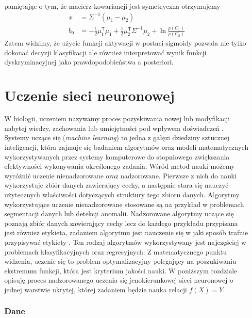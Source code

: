 \documentclass[11pt]{book}
\theoremstyle{definition}
\begin{document}
%
pamiętając o tym, że macierz kowariancji jest symetryczna otrzymujemy
%
\begin{subequations}
	\begin{align}
	x &= \Sigma^{-1} \left(\mu_1 - \mu_2\right)\\
	b_0 &= - \frac{1}{2} \mu_1^\mathsf{T}\mu_1 + \frac{1}{2} \mu_2^\mathsf{T} \Sigma^{-1} \mu_2 + \ln \frac{p(C_1)}{p(C_2)}
	\end{align}
\end{subequations}
%
Zatem widzimy, że użycie funkcji aktywacji w postaci sigmoidy pozwala nie tylko dokonać decyzji klasyfikacji ale również interpretować wynik funkcji dyskryminacyjnej jako prawdopodobieństwa a posteriori.
%
\fi


\section{Uczenie sieci neuronowej}
\label{backprop}

W biologii, uczeniem nazywamy proces pozyskiwania nowej lub modyfikacji nabytej wiedzy, zachowania lub umiejętności pod wpływem doświadczeń \cite{2008:Biologia}. Systemy uczące się (\textit{machine learning}) to jedna z gałęzi dziedziny sztucznej inteligencji, która zajmuje się badaniem algorytmów oraz modeli matematycznych wykorzystywanych przez systemy komputerowe do stopniowego zwiększania efektywności wykonywania określonego zadania. Wśród metod nauki możemy wyróżnić uczenie nienadzorowane oraz nadzorowane. Pierwsze z nich do nauki wykorzystuje zbiór danych zawierający cechy, a następnie stara się nauczyć użytecznych właściwości dotyczących struktury tego zbioru danych. Algorytmy wykorzystujące uczenie nienadzorowane stosowane są na przykład w problemach segmentacji danych lub detekcji anomalii. Nadzorowane algorytmy uczące się poznają zbiór danych zawierający cechy lecz do każdego przykładu przypisana jest również etykieta, zadaniem algorytmu jest nauczenie się w jaki sposób trafnie przypisywać etykiety \cite{Goodfellow-et-al-2016}. Ten rodzaj algorytmów wykorzystywany jest najczęściej w problemach klasyfikacyjnych oraz regresyjnych. Z matematycznego punktu widzenia, uczenie się to problem optymalizacyjny polegający na poszukiwaniu ekstremum funkcji, która jest kryterium jakości nauki. W poniższym rozdziale opisuję proces nadzorowanego uczenia się jenokierunkowej sieci neuronowej o jednej warstwie ukrytej, której zadaniem będzie nauka relacji $f(X)  = Y$.


\subsubsection{Dane}
\end{document}
